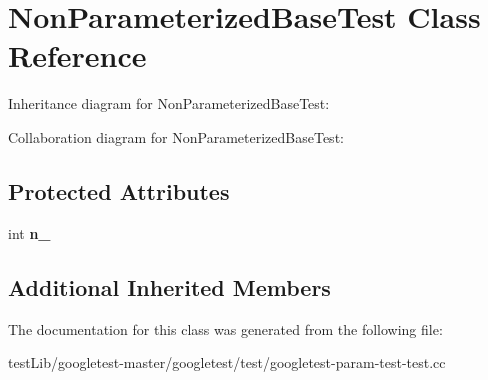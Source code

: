 \hypertarget{classNonParameterizedBaseTest}{}\section{Non\+Parameterized\+Base\+Test Class Reference}
\label{classNonParameterizedBaseTest}


Inheritance diagram for Non\+Parameterized\+Base\+Test\+:


Collaboration diagram for Non\+Parameterized\+Base\+Test\+:
\subsection*{Protected Attributes}
\begin{DoxyCompactItemize}
\item 
\mbox{\label{classNonParameterizedBaseTest_a617d4bbfd2aa5f6d41eea3089f7ad039}} 
int {\bfseries n\+\_\+}
\end{DoxyCompactItemize}
\subsection*{Additional Inherited Members}


The documentation for this class was generated from the following file\+:\begin{DoxyCompactItemize}
\item 
test\+Lib/googletest-\/master/googletest/test/googletest-\/param-\/test-\/test.\+cc\end{DoxyCompactItemize}
